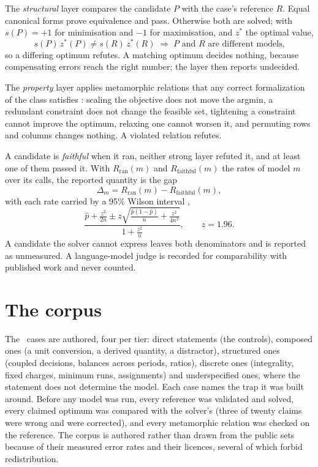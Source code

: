 \documentclass[journal]{IEEEtran}
\begin{document}
The \emph{structural} layer compares the candidate $P$ with the case's reference $R$. Equal canonical
forms prove equivalence and pass. Otherwise both are solved; with $s(P)=+1$ for minimisation and
$-1$ for maximisation, and $z^*$ the optimal value,
\begin{equation}
s(P)\,z^*(P) \neq s(R)\,z^*(R) \;\Rightarrow\; P \text{ and } R \text{ are different models,}
\end{equation}
so a differing optimum refutes. A matching optimum decides nothing, because compensating errors reach
the right number; the layer then reports undecided.

The \emph{property} layer applies metamorphic relations that any correct formalization of the class
satisfies \cite{segura2016}: scaling the objective does not move the argmin, a redundant constraint
does not change the feasible set, tightening a constraint cannot improve the optimum, relaxing one
cannot worsen it, and permuting rows and columns changes nothing. A violated relation refutes.

A candidate is \emph{faithful} when it ran, neither strong layer refuted it, and at least one of them
passed it. With $R_{\mathrm{ran}}(m)$ and $R_{\mathrm{faithful}}(m)$ the rates of model $m$ over its
calls, the reported quantity is the gap
\begin{equation}
\Delta_m = R_{\mathrm{ran}}(m) - R_{\mathrm{faithful}}(m),
\end{equation}
with each rate carried by a 95\% Wilson interval \cite{wilson1927,agresti1998},
\begin{equation}
\frac{\hat p + \frac{z^2}{2n} \pm z\sqrt{\frac{\hat p(1-\hat p)}{n} + \frac{z^2}{4n^2}}}{1 + \frac{z^2}{n}}, \qquad z = 1.96 .
\end{equation}
A candidate the solver cannot express leaves both denominators and is reported as unmeasured. A
language-model judge is recorded for comparability with published work and never counted.

\section{The corpus}\label{sec:corpus}

The \nCases\ cases are authored, four per tier: direct statements (the controls), composed ones
(a unit conversion, a derived quantity, a distractor), structured ones (coupled decisions, balances
across periods, ratios), discrete ones (integrality, fixed charges, minimum runs, assignments) and
underspecified ones, where the statement does not determine the model. Each case names the trap it
was built around. Before any model was run, every reference was validated and solved, every claimed
optimum was compared with the solver's (three of twenty claims were wrong and were corrected), and
every metamorphic relation was checked on the reference. The corpus is authored rather than drawn
from the public sets because of their measured error rates \cite{survey2025} and their licences,
several of which forbid redistribution.
\end{document}

